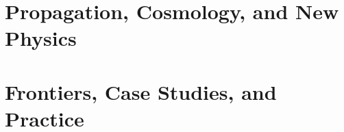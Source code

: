 \documentclass[11pt,openany]{book}
\begin{document}
\part{Propagation, Cosmology, and New Physics}




\part{Frontiers, Case Studies, and Practice}






\appendix








\backmatter


\end{document}
